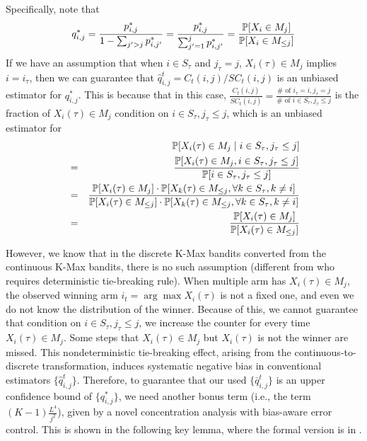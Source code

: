 Specifically, note that 
\begin{eqnarray*}
    q^*_{i,j} = \frac{p^*_{i,j}}{1 - \sum_{j' > j} p^*_{i,j'}} = \frac{p^*_{i,j}}{\sum_{j'=1}^j p^*_{i,j'}} = \frac{{\mathbb{P}}[X_i \in M_j]}{{\mathbb{P}}[X_i \in M_{\le j}]} 
\end{eqnarray*}
If we have an assumption that when $i\in S_\tau$ and $j_\tau = j$, $X_i(\tau) \in M_j$ implies $i = i_\tau$, then we can guarantee that $\hat q_{i,j}^{t} = C_t(i,j) / SC_{t}(i,j)$ is an unbiased estimator for $q^*_{i,j}$. This is because that in this case, $\frac{C_t(i,j)}{ SC_{t}(i,j) }= \frac{\# \text{ of } i_\tau = i, j_\tau = j}{\# \text{ of } i\in S_\tau, j_\tau \le j} $ is the fraction of $X_i(\tau) \in M_j$ condition on $i\in S_\tau, j_\tau \le j$, 
%
which is an unbiased estimator for 
\begin{eqnarray*}
    && {\mathbb{P}}[X_i(\tau) \in M_j \mid i\in S_\tau, j_\tau \le j]\\
    &=&  \frac{{\mathbb{P}}[X_i(\tau) \in M_j, i\in S_\tau, j_\tau \le j]}{{\mathbb{P}}[i\in S_\tau, j_\tau \le j]}\\
    &=&\frac{{\mathbb{P}}[X_i(\tau)  \in M_j]\cdot {\mathbb{P}}[X_k(\tau)  \in M_{\le j}, \forall k \in S_{\tau}, k \neq i]}{{\mathbb{P}}[X_i(\tau)  \in M_{\le j}] \cdot {\mathbb{P}}[X_k(\tau)  \in M_{\le j}, \forall k \in S_{\tau}, k \neq i]}\\
    &=&\frac{{\mathbb{P}}[X_i(\tau) \in M_j]}{{\mathbb{P}}[X_i(\tau) \in M_{\le j}]}
\end{eqnarray*}

However, we know that in the discrete K-Max bandits converted from the continuous K-Max bandits, there is no such assumption (different from \citet{wang2023combinatorial} who requires deterministic tie-breaking rule). When multiple arm has $X_i(\tau) \in M_j$, the observed winning arm $i_t = \arg\max X_i(\tau)$ is not a fixed one, and even we do not know the distribution of the winner. 
%
Because of this, we cannot guarantee that condition on $i\in S_\tau, j_\tau \le j$, we increase the counter for every time $X_i(\tau) \in M_j$. Some steps that $X_i(\tau) \in M_j$ but $X_i(\tau)$ is not the winner are missed. 
%
This nondeterministic tie-breaking effect, arising from the continuous-to-discrete transformation, induces systematic negative bias in conventional estimators $\{\hat q_{i,j}^t\}$.
%
Therefore, to guarantee that our used $\{\bar q_{i,j}^t\}$ is an upper confidence bound of $\{ q_{i,j}^*\}$, we need another bonus term (i.e., the term $(K-1)\frac{L^4}{j^2}$), given by a novel concentration analysis with bias-aware error control. This is shown in the following key lemma, where the formal version is in .


